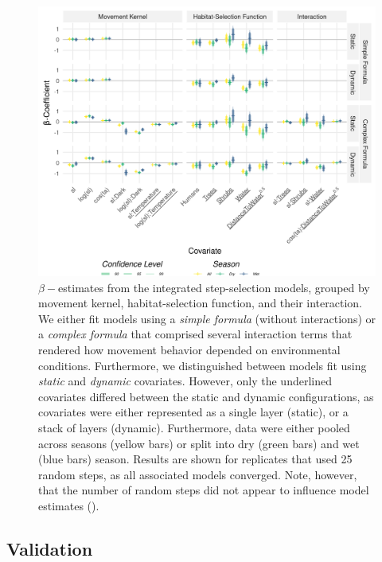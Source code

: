 \documentclass[../FinalThesis.tex]{subfiles}
\begin{document}
\begin{figure}[htpb]
 \begin{center}
  \includegraphics[width = \textwidth]{Figures/MovementModel.png}
  \caption{$\beta-$estimates from the integrated step-selection models, grouped
  by movement kernel, habitat-selection function, and their interaction. We
  either fit models using a \textit{simple formula} (without interactions) or a
  \textit{complex formula} that comprised several interaction terms that rendered
  how movement behavior depended on environmental conditions. Furthermore, we
  distinguished between models fit using \textit{static} and \textit{dynamic}
  covariates. However, only the underlined covariates differed between the
  static and dynamic configurations, as covariates were either represented as a
  single layer (static), or a stack of layers (dynamic). Furthermore, data were
  either pooled across seasons (yellow bars) or split into dry (green bars) and
  wet (blue bars) season. Results are shown for replicates that used 25 random
  steps, as all associated models converged. Note, however, that the number of
  random steps did not appear to influence model estimates ().}
  \label{MovementModelCH3}
 \end{center}
\end{figure}

\subsection{Validation}
\end{document}
